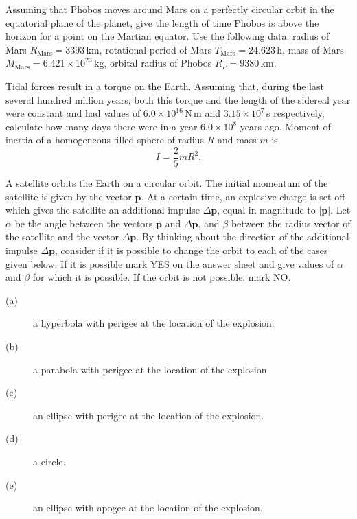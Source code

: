 Assuming that Phobos moves around Mars on a perfectly circular orbit in the
equatorial plane of the planet, give the length of time Phobos is above the
horizon for a point on the Martian equator. Use the following data: radius of
Mars $R_{\mathrm{Mars}} = 3393$\,km, rotational period of Mars
$T_{\mathrm{Mars}} = 24.623$\,h, mass of Mars
$M_{\mathrm{Mars}} = 6.421 \times 10^{23}$\,kg, orbital radius of Phobos
$R_P = 9380$\,km.

Tidal forces result in a torque on the Earth. Assuming that, during the last
several hundred million years, both this torque and the length of the sidereal
year were constant and had values of $6.0 \times 10^{16}$\,N\,m and
$3.15 \times 10^{7}$\,s respectively, calculate how many days there were in a
year $6.0 \times 10^{8}$ years ago. Moment of inertia of a homogeneous filled
sphere of radius $R$ and mass $m$ is
\[ I = \frac{2}{5} m R^2. \]

A satellite orbits the Earth on a circular orbit. The initial momentum of the
satellite is given by the vector $\mathbf{p}$. At a certain time, an explosive
charge is set off which gives the satellite an additional impulse
$\Delta\mathbf{p}$, equal in magnitude to $|\mathbf{p}|$. Let $\alpha$ be the
angle between the vectors $\mathbf{p}$ and $\Delta\mathbf{p}$, and $\beta$
between the radius vector of the satellite and the vector $\Delta\mathbf{p}$.
By thinking about the direction of the additional impulse $\Delta\mathbf{p}$,
consider if it is possible to change the orbit to each of the cases given
below. If it is possible mark YES on the answer sheet and give values of
$\alpha$ and $\beta$ for which it is possible. If the orbit is not possible,
mark NO.

\begin{description}
\item[(a)] a hyperbola with perigee at the location of the explosion.
\item[(b)] a parabola with perigee at the location of the explosion.
\item[(c)] an ellipse with perigee at the location of the explosion.
\item[(d)] a circle.
\item[(e)] an ellipse with apogee at the location of the explosion.
\end{description}

